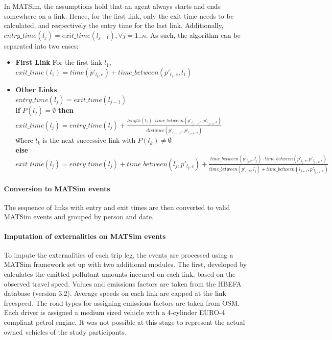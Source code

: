 In MATSim, the assumptions hold that an agent always starts and ends somewhere on a link.
Hence, for the first link, only the exit time needs to be calculated, and respectively the entry time for the last link.
Additionally, $entry\_time(l_{j}) = exit\_time(l_{j-1}),  \forall j = 1..n$.
As such, the algorithm can be separated into two cases:
\begin{itemize}
	\item \textbf{First Link} For the first link $l_1$, $exit\_time(l_1) = time(p'_{l_1,e}) + time\_between(p'_{l_1,e}, l_1)$
	\item \textbf{Other Links} \\
		$entry\_time(l_{j}) = exit\_time(l_{j-1}) $ \\
		\textbf{if} $P(l_j) = \emptyset$ \textbf{then} $exit\_time(l_j) = entry\_time(l_j) + 
										\frac{length(l_j) \cdot time\_between(p'_{l_{j-1},e}, p'_{l_{j+k},s})}{distance(p'_{l_{j-1},e}, p'_{l_{j+k},s})} $ \\
										\t where $l_{k}$ is the next successive link with $P(l_k) \neq \emptyset$  \\
		\textbf{else}  $exit\_time(l_j) = entry\_time(l_j) + time\_between(l_{j}, p'_{l_j,e}) + \frac{time\_between(p'_{l_j,e}, l_{j}) \cdot time\_between(p'_{l_j,e}, p'_{l_{j+1},s})} 
					{time\_between(p'_{l_j,e}, l_{j}) + time\_between(l_{j+1},p'_{l_{j+1},s})}   $ \\
\end{itemize}

\paragraph{Conversion to MATSim events} 
The sequence of links with entry and exit times are then converted to valid MATSim events and grouped by person and date.

\paragraph{Imputation of externalities on MATSim events}
To impute the externalities of each trip leg, the events are processed using a MATSim framework set up with two additional modules.
The first, developed by \citet{kaddoura2017simulation} calculates the emitted pollutant amounts inccured on each link, based on the observed travel speed.
Values and emissions factors are taken from the HBEFA database (version 3.2).
Average speeds on each link are capped at the link freespeed.
The road types for assigning emissions factors are taken from OSM.
Each driver is assigned a medium sized vehicle with a 4-cylinder EURO-4 compliant petrol engine.
It was not possible at this stage to represent the actual owned vehicles of the study participants.

